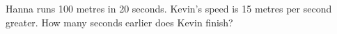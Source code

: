 Hanna runs 100 metres in 20 seconds. Kevin's speed is 15 metres per second greater. How many seconds earlier does Kevin finish?
